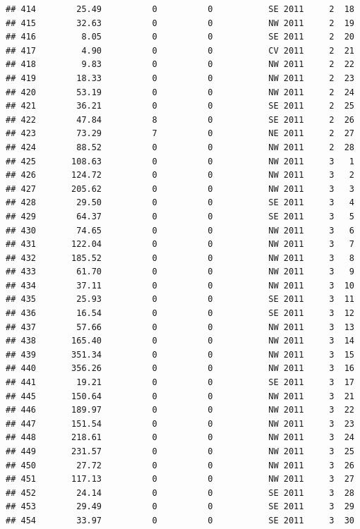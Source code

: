 \documentclass[
]{article}
\begin{document}
\begin{verbatim}
## 414        25.49          0          0           SE 2011     2  18
## 415        32.63          0          0           NW 2011     2  19
## 416         8.05          0          0           SE 2011     2  20
## 417         4.90          0          0           CV 2011     2  21
## 418         9.83          0          0           NW 2011     2  22
## 419        18.33          0          0           NW 2011     2  23
## 420        53.19          0          0           NW 2011     2  24
## 421        36.21          0          0           SE 2011     2  25
## 422        47.84          8          0           SE 2011     2  26
## 423        73.29          7          0           NE 2011     2  27
## 424        88.52          0          0           NW 2011     2  28
## 425       108.63          0          0           NW 2011     3   1
## 426       124.72          0          0           NW 2011     3   2
## 427       205.62          0          0           NW 2011     3   3
## 428        29.50          0          0           SE 2011     3   4
## 429        64.37          0          0           SE 2011     3   5
## 430        74.65          0          0           NW 2011     3   6
## 431       122.04          0          0           NW 2011     3   7
## 432       185.52          0          0           NW 2011     3   8
## 433        61.70          0          0           NW 2011     3   9
## 434        37.11          0          0           NW 2011     3  10
## 435        25.93          0          0           SE 2011     3  11
## 436        16.54          0          0           SE 2011     3  12
## 437        57.66          0          0           NW 2011     3  13
## 438       165.40          0          0           NW 2011     3  14
## 439       351.34          0          0           NW 2011     3  15
## 440       356.26          0          0           NW 2011     3  16
## 441        19.21          0          0           SE 2011     3  17
## 445       150.64          0          0           NW 2011     3  21
## 446       189.97          0          0           NW 2011     3  22
## 447       151.54          0          0           NW 2011     3  23
## 448       218.61          0          0           NW 2011     3  24
## 449       231.57          0          0           NW 2011     3  25
## 450        27.72          0          0           NW 2011     3  26
## 451       117.13          0          0           NW 2011     3  27
## 452        24.14          0          0           SE 2011     3  28
## 453        29.49          0          0           SE 2011     3  29
## 454        33.97          0          0           SE 2011     3  30

\end{verbatim}
\end{document}
